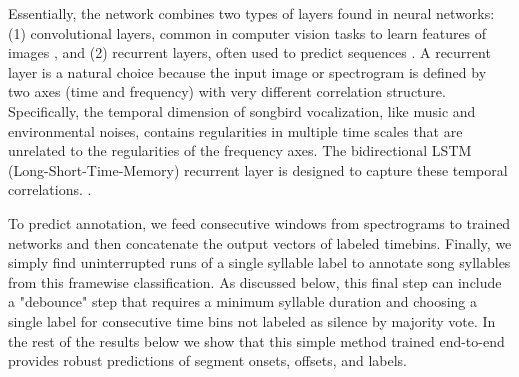 \documentclass[10pt,letterpaper]{article}
\begin{document}
Essentially, the network combines two types of layers found in neural networks:(1) convolutional layers, common in computer vision tasks to learn features of images \cite{goodfellow_deep_2016,farabet_learning_2013,krizhevsky_imagenet_2012}, and (2) recurrent layers, often used to predict sequences \cite{graves_supervised_2012}. A recurrent layer is a natural choice because the input image or spectrogram is defined by two axes (time and frequency) with very different correlation structure.  Specifically, the temporal dimension of songbird vocalization, like music and environmental noises, contains regularities in multiple time scales that are unrelated to the regularities of the frequency axes. The bidirectional LSTM (Long-Short-Time-Memory) recurrent layer is designed to capture these temporal correlations. \cite{bock_polyphonic_2012-1,parascandolo_recurrent_2016}. 

To predict annotation, we feed consecutive windows from spectrograms to trained networks and
then concatenate the output vectors of labeled timebins. 
Finally, we simply find uninterrupted runs of a single syllable label to annotate song syllables from this framewise classification. As discussed below, this final step can include a "debounce" step that requires a minimum syllable duration and choosing a single label for consecutive time bins not labeled as silence by majority vote. In the rest of the results below we show that this simple method trained end-to-end 
provides robust predictions of segment onsets, offsets, and labels.
\end{document}
